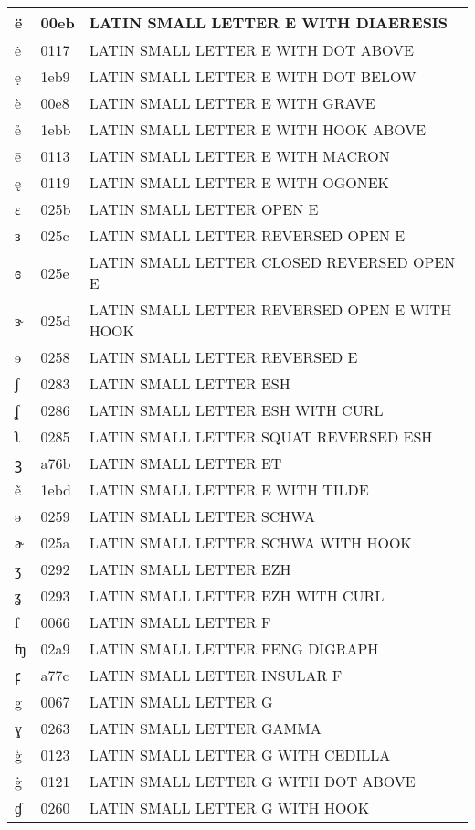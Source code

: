 \documentclass[12pt,letterpaper,openany]{book}
\begin{document}
\begin{center}
\begin{supertabular}{|m{0.25in}|m{0.5in}|m{4in}|}
ë & 00eb & LATIN SMALL LETTER E WITH DIAERESIS\\\hline
ė & 0117 & LATIN SMALL LETTER E WITH DOT ABOVE\\\hline
ẹ & 1eb9 & LATIN SMALL LETTER E WITH DOT BELOW\\\hline
è & 00e8 & LATIN SMALL LETTER E WITH GRAVE\\\hline
ẻ & 1ebb & LATIN SMALL LETTER E WITH HOOK ABOVE\\\hline
ē & 0113 & LATIN SMALL LETTER E WITH MACRON\\\hline
ę & 0119 & LATIN SMALL LETTER E WITH OGONEK\\\hline
ɛ & 025b & LATIN SMALL LETTER OPEN E\\\hline
ɜ & 025c & LATIN SMALL LETTER REVERSED OPEN E\\\hline
ɞ & 025e & LATIN SMALL LETTER CLOSED REVERSED OPEN E\\\hline
ɝ & 025d & LATIN SMALL LETTER REVERSED OPEN E WITH HOOK\\\hline
ɘ & 0258 & LATIN SMALL LETTER REVERSED E\\\hline
ʃ & 0283 & LATIN SMALL LETTER ESH\\\hline
ʆ & 0286 & LATIN SMALL LETTER ESH WITH CURL\\\hline
ʅ & 0285 & LATIN SMALL LETTER SQUAT REVERSED ESH\\\hline
ꝫ & a76b & LATIN SMALL LETTER ET\\\hline
ẽ & 1ebd & LATIN SMALL LETTER E WITH TILDE\\\hline
ə & 0259 & LATIN SMALL LETTER SCHWA\\\hline
ɚ & 025a & LATIN SMALL LETTER SCHWA WITH HOOK\\\hline
ʒ & 0292 & LATIN SMALL LETTER EZH\\\hline
ʓ & 0293 & LATIN SMALL LETTER EZH WITH CURL\\\hline
f & 0066 & LATIN SMALL LETTER F\\\hline
ʩ & 02a9 & LATIN SMALL LETTER FENG DIGRAPH\\\hline
ꝼ & a77c & LATIN SMALL LETTER INSULAR F\\\hline
g & 0067 & LATIN SMALL LETTER G\\\hline
ɣ & 0263 & LATIN SMALL LETTER GAMMA\\\hline
ģ & 0123 & LATIN SMALL LETTER G WITH CEDILLA\\\hline
ġ & 0121 & LATIN SMALL LETTER G WITH DOT ABOVE\\\hline
ɠ & 0260 & LATIN SMALL LETTER G WITH HOOK\\\hline

\end{supertabular}
\end{center}
\end{document}

